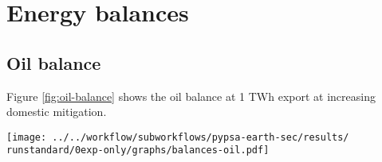 \section{Energy balances}



\subsection{Oil balance}
\label{subsec:oil-balance}
Figure \ref{fig:oil-balance} shows the oil balance at 1 TWh export at increasing domestic mitigation.

\begin{figure*}[h]
    \centering
    \texttt{[image: ../../workflow/subworkflows/pypsa-earth-sec/results/\\runstandard/0exp-only/graphs/balances-oil.pdf]}
    \caption{Oil balance at 1 TWh export at increasing domestic mitigation. The exogenously defined oil demand for land transport significantly decreases due to electrification, oil demands for industrial naphta, aviation, agriculture are constant. The demand is met by fossil oil up to 80\% mitigation, then gradually replaced by Fischer-Tropsch fuels.}
    \label{fig:oil-balance}
\end{figure*}





    
    

    
    

\clearpage